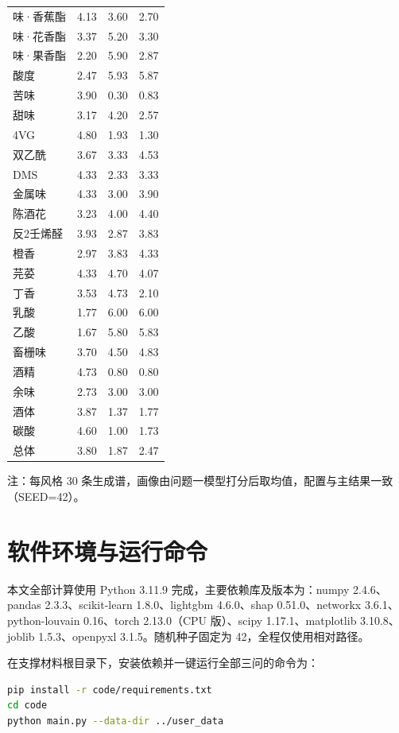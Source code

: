 \documentclass[zihao=-4,a4paper,UTF8,fontset=none]{ctexart}
\begin{document}
\begin{longtable}{@{}p{3.2cm}rrr@{}}
味·香蕉酯 & 4.13 & 3.60 & 2.70 \\
味·花香酯 & 3.37 & 5.20 & 3.30 \\
味·果香酯 & 2.20 & 5.90 & 2.87 \\
酸度 & 2.47 & 5.93 & 5.87 \\
苦味 & 3.90 & 0.30 & 0.83 \\
甜味 & 3.17 & 4.20 & 2.57 \\
4VG & 4.80 & 1.93 & 1.30 \\
双乙酰 & 3.67 & 3.33 & 4.53 \\
DMS & 4.33 & 2.33 & 3.33 \\
金属味 & 4.33 & 3.00 & 3.90 \\
陈酒花 & 3.23 & 4.00 & 4.40 \\
反2壬烯醛 & 3.93 & 2.87 & 3.83 \\
橙香 & 2.97 & 3.83 & 4.33 \\
芫荽 & 4.33 & 4.70 & 4.07 \\
丁香 & 3.53 & 4.73 & 2.10 \\
乳酸 & 1.77 & 6.00 & 6.00 \\
乙酸 & 1.67 & 5.80 & 5.83 \\
畜栅味 & 3.70 & 4.50 & 4.83 \\
酒精 & 4.73 & 0.80 & 0.80 \\
余味 & 2.73 & 3.00 & 3.00 \\
酒体 & 3.87 & 1.37 & 1.77 \\
碳酸 & 4.60 & 1.00 & 1.73 \\
总体 & 3.80 & 1.87 & 2.47 \\
\end{longtable}

\noindent\footnotesize 注：每风格 30 条生成谱，画像由问题一模型打分后取均值，配置与主结果一致（SEED=42）。

\section{软件环境与运行命令}

本文全部计算使用 Python 3.11.9 完成，主要依赖库及版本为：numpy 2.4.6、pandas 2.3.3、scikit-learn 1.8.0、lightgbm 4.6.0、shap 0.51.0、networkx 3.6.1、python-louvain 0.16、torch 2.13.0（CPU 版）、scipy 1.17.1、matplotlib 3.10.8、joblib 1.5.3、openpyxl 3.1.5。随机种子固定为 42，全程仅使用相对路径。

在支撑材料根目录下，安装依赖并一键运行全部三问的命令为：

\begin{lstlisting}[language=bash]
pip install -r code/requirements.txt
cd code
python main.py --data-dir ../user_data
\end{lstlisting}
\end{document}
